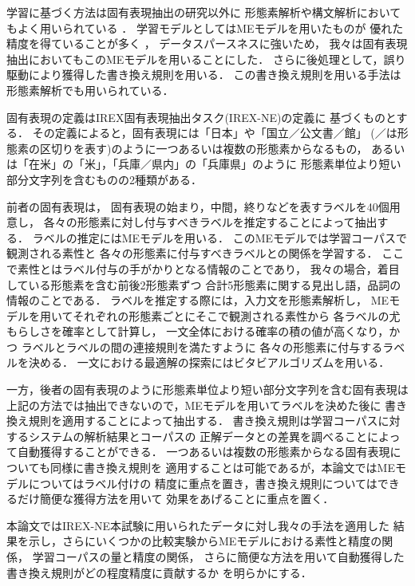 学習に基づく方法は固有表現抽出の研究以外に
形態素解析や構文解析においてもよく用いられている
\cite{Uchimoto99_jinbun}．
学習モデルとしてはMEモデルを用いたものが
優れた精度を得ていることが多く
\cite{ratnaparkhi:emnlp96,ratnaparkhi:emnlp97,Uchimoto:eacl99}，
データスパースネスに強いため，
我々は固有表現抽出においてもこのMEモデルを用いることにした．
さらに後処理として，誤り駆動により獲得した書き換え規則を用いる．
この書き換え規則を用いる手法は
形態素解析でも用いられている\cite{Brill:95,Hisamitsu:98}．

固有表現の定義はIREX固有表現抽出タスク(IREX-NE)の定義\cite{irex:homepage}に
基づくものとする．
その定義によると，固有表現には「日本」や「国立／公文書／館」
(／は形態素の区切りを表す)のように一つあるいは複数の形態素からなるもの，
あるいは「在米」の「米」，「兵庫／県内」の「兵庫県」のように
形態素単位より短い部分文字列を含むものの2種類がある．

前者の固有表現は，
固有表現の始まり，中間，終りなどを表すラベルを40個用意し，
各々の形態素に対し付与すべきラベルを推定することによって抽出する．
ラベルの推定にはMEモデルを用いる．
このMEモデルでは学習コーパスで観測される素性と
各々の形態素に付与すべきラベルとの関係を学習する．
ここで素性とはラベル付与の手がかりとなる情報のことであり，
我々の場合，着目している形態素を含む前後2形態素ずつ
合計5形態素に関する見出し語，品詞の情報のことである．
ラベルを推定する際には，入力文を形態素解析し，
MEモデルを用いてそれぞれの形態素ごとにそこで観測される素性から
各ラベルの尤もらしさを確率として計算し，
一文全体における確率の積の値が高くなり，かつ
ラベルとラベルの間の連接規則を満たすように
各々の形態素に付与するラベルを決める．
一文における最適解の探索にはビタビアルゴリズムを用いる．

一方，後者の固有表現のように形態素単位より短い部分文字列を含む固有表現は
上記の方法では抽出できないので，MEモデルを用いてラベルを決めた後に
書き換え規則を適用することによって抽出する．
書き換え規則は学習コーパスに対するシステムの解析結果とコーパスの
正解データとの差異を調べることによって自動獲得することができる．
一つあるいは複数の形態素からなる固有表現についても同様に書き換え規則を
適用することは可能であるが，本論文ではMEモデルについてはラベル付けの
精度に重点を置き，書き換え規則についてはできるだけ簡便な獲得方法を用いて
効果をあげることに重点を置く．

本論文ではIREX-NE本試験に用いられたデータに対し我々の手法を適用した
結果を示し，さらにいくつかの比較実験からMEモデルにおける素性と精度の関係，
学習コーパスの量と精度の関係，
さらに簡便な方法を用いて自動獲得した書き換え規則がどの程度精度に貢献するか
を明らかにする．

